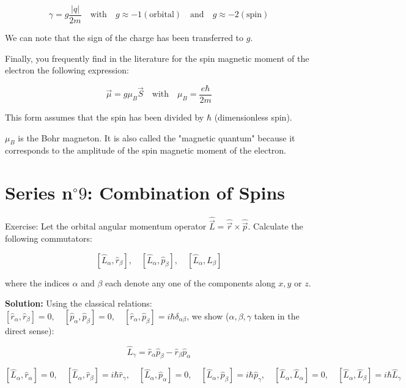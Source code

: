 \documentclass{article}
\begin{document}
\begin{enumerate}
{    $$
    \gamma = g \frac{|q|}{2 m} \quad \text{with} \quad g \approx -1 (\text{orbital}) \quad \text{and} \quad g \approx -2 (\text{spin})
    $$

    We can note that the sign of the charge has been transferred to $g$.

    Finally, you frequently find in the literature for the spin magnetic moment of the electron the following expression:

    $$
    \vec{\mu} = g \mu_{B} \vec{S} \quad \text{with} \quad \mu_{B} = \frac{e \hbar}{2 m}
    $$

    This form assumes that the spin has been divided by $\hbar$ (dimensionless spin).

    $\mu_{B}$ is the Bohr magneton. It is also called the "magnetic quantum" because it corresponds to the amplitude of the spin magnetic moment of the electron.}
    
    \newpage
    \end{enumerate}

    \section*{Series n$^{\circ} 9$: Combination of Spins}

    Exercise: Let the orbital angular momentum operator $\hat{\vec{L}} = \hat{\vec{r}} \times \hat{\vec{p}}$. Calculate the following commutators:

    $$
    \left[\hat{L}_{\alpha}, \hat{r}_{\beta}\right], \quad \left[\hat{L}_{\alpha}, \hat{p}_{\beta}\right], \quad \left[\hat{L}_{\alpha}, \hat{L}_{\beta}\right]
    $$

    where the indices $\alpha$ and $\beta$ each denote any one of the components along $x, y$ or $z$.

    {\color{red}\textbf{Solution:} Using the classical relations: $\left[\hat{r}_{\alpha}, \hat{r}_{\beta}\right] = 0, \quad \left[\hat{p}_{\alpha}, \hat{p}_{\beta}\right] = 0, \quad \left[\hat{r}_{\alpha}, \hat{p}_{\beta}\right] = i \hbar \delta_{\alpha \beta}$, we show ($\alpha, \beta, \gamma$ taken in the direct sense):

    $$
    \hat{L}_{\gamma} = \hat{r}_{\alpha} \hat{p}_{\beta} - \hat{r}_{\beta} \hat{p}_{\alpha}
    $$

    $$
    \left[\hat{L}_{\alpha}, \hat{r}_{\alpha}\right] = 0, \quad \left[\hat{L}_{\alpha}, \hat{r}_{\beta}\right] = i \hbar \hat{r}_{\gamma}, \quad \left[\hat{L}_{\alpha}, \hat{p}_{\alpha}\right] = 0, \quad \left[\hat{L}_{\alpha}, \hat{p}_{\beta}\right] = i \hbar \hat{p}_{\gamma}, \quad \left[\hat{L}_{\alpha}, \hat{L}_{\alpha}\right] = 0, \quad \left[\hat{L}_{\alpha}, \hat{L}_{\beta}\right] = i \hbar \hat{L}_{\gamma}
    $$}
    
\end{document}

